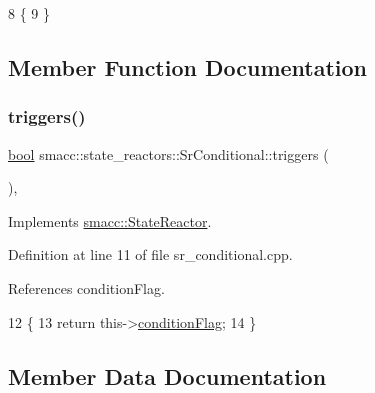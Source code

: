 \begin{DoxyCode}
8 \{
9 \}
\end{DoxyCode}


\subsection{Member Function Documentation}
\mbox{\label{classsmacc_1_1state__reactors_1_1SrConditional_acbd91c59644957faac4e9d7716513cb4}} 
\subsubsection{\texorpdfstring{triggers()}{triggers()}}
{\footnotesize\ttfamily \hyperlink{classbool}{bool} smacc\+::state\+\_\+reactors\+::\+Sr\+Conditional\+::triggers (\begin{DoxyParamCaption}{ }\end{DoxyParamCaption})\hspace{0.3cm}{\ttfamily [override]}, {\ttfamily [virtual]}}



Implements \hyperlink{classsmacc_1_1StateReactor_a445bc3c90980d75d7d815b85cfb68b21}{smacc\+::\+State\+Reactor}.



Definition at line 11 of file sr\+\_\+conditional.\+cpp.



References condition\+Flag.


\begin{DoxyCode}
12 \{
13     \textcolor{keywordflow}{return} this->\hyperlink{classsmacc_1_1state__reactors_1_1SrConditional_a3642c78c02f02ed8eb0e5a41240f445c}{conditionFlag};
14 \}
\end{DoxyCode}


\subsection{Member Data Documentation}
\mbox{\label{classsmacc_1_1state__reactors_1_1SrConditional_a3642c78c02f02ed8eb0e5a41240f445c}} 
